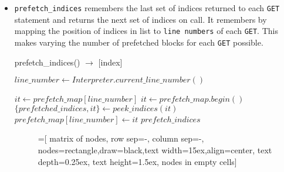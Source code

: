 \begin{itemize}
\item \texttt{prefetch\_indices} remembers the last set of indices returned to each
  \texttt{GET} statement and returns the next set of indices on call. It remembers
  by mapping the position of indices in list to \texttt{line numbers} of each
  \texttt{GET}. This makes varying the number of prefetched blocks for each
  \texttt{GET} possible.

  \begin{algorithm} {prefetch\_indices() $\rightarrow$ [index]}
    \singlespacing

    \begin{algorithmic}[1]
      \State $line\_number \gets Interpreter.current\_line\_number()$

      \State $it \gets prefetch\_map[line\_number]$
      \Else
      \State $it \gets prefetch\_map.begin()$
      \EndIf
      \State $\{prefetched\_indices, it\} \gets peek\_indices(it)$
      \State $prefetch\_map[line\_number] \gets it$
      \State \Return $prefetch\_indices$
      \EndFunction
    \end{algorithmic}
  \end{algorithm}

  \begin{figure}[h] %
    \centering

    =[
    matrix of nodes,
    row sep=-\pgflinewidth,
    column sep=-\pgflinewidth,
    nodes={rectangle,draw=black,text width=15ex,align=center},
    text depth=0.25ex,
    text height=1.5ex,
    nodes in empty cells]
\end{figure}
\end{itemize}
